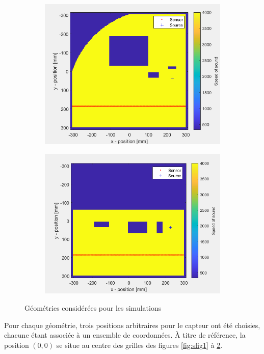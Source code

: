 \documentclass[conference]{IEEEtran}
\begin{document}
\begin{figure}[H]
\begin{subfigure}{.155\textwidth}
    \includegraphics[width=.95\linewidth]{forme5.png}
    \caption{}
    \label{fig:sfig5}
  \end{subfigure}
  \begin{subfigure}{.155\textwidth}
    \centering
    \includegraphics[width=.95\linewidth]{forme6.png}
    \caption{}
    \label{fig:sfig6}
  \end{subfigure}
  \caption{Géométries considérées pour les simulations}
  \label{fig:fig}
\end{figure}
Pour chaque géométrie, trois positions arbitraires pour le capteur ont été choisies,
chacune étant associée à un ensemble de coordonnées. À titre de référence, la position $(0,0)$ se situe 
au centre des grilles des figures \ref{fig:sfig1} à \ref{fig:sfig6}. 
\end{document}
